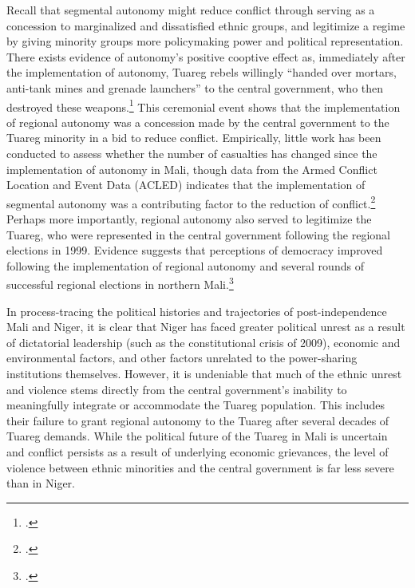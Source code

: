 \documentclass[12pt]{article}
\begin{document}
Recall that segmental autonomy might reduce conflict through serving as a concession to marginalized and dissatisfied ethnic groups, and legitimize a regime by giving minority groups more policymaking power and political representation. There exists evidence of autonomy's positive cooptive effect as, immediately after the implementation of autonomy, Tuareg rebels willingly ``handed over mortars, anti-tank mines and grenade launchers'' to the central government, who then destroyed these weapons.\footcite{unknown_tuareg_2008} This ceremonial event shows that the implementation of regional autonomy was a concession made by the central government to the Tuareg minority in a bid to reduce conflict. Empirically, little work has been conducted to assess whether the number of casualties has changed since the implementation of autonomy in Mali, though data from the Armed Conflict Location and Event Data (ACLED) indicates that the implementation of segmental autonomy was a contributing factor to the reduction of conflict.\footcite[,unpublished manuscript]{raleigh_introducing_2010, brailey_after_2019} Perhaps more importantly, regional autonomy also served to legitimize the Tuareg, who were represented in the central government following the regional elections in 1999. Evidence suggests that perceptions of democracy improved following the implementation of regional autonomy and several rounds of successful regional elections in northern Mali.\footcite{world_values_survey_world_2007}

In process-tracing the political histories and trajectories of post-independence Mali and Niger, it is clear that Niger has faced greater political unrest as a result of dictatorial leadership (such as the constitutional crisis of 2009), economic and environmental factors, and other factors unrelated to the power-sharing institutions themselves. However, it is undeniable that much of the ethnic unrest and violence stems directly from the central government's inability to meaningfully integrate or accommodate the Tuareg population. This includes their failure to grant regional autonomy to the Tuareg after several decades of Tuareg demands. While the political future of the Tuareg in Mali is uncertain and conflict persists as a result of underlying economic grievances, the level of violence between ethnic minorities and the central government is far less severe than in Niger.
\end{document}
